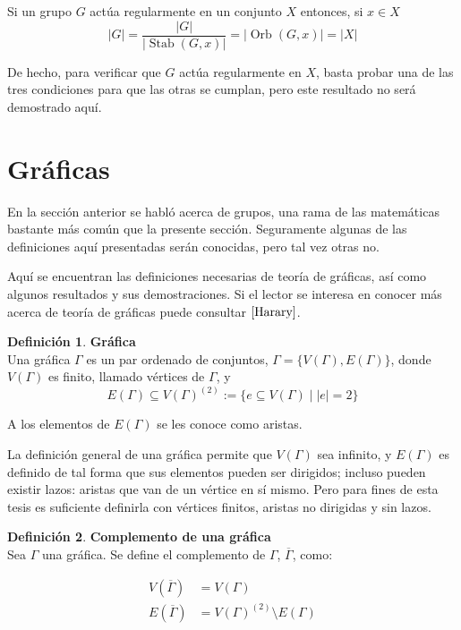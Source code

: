 \documentclass[12pt]{book}
\theoremstyle{definition}
\newtheorem{definition}{Definición}
\DeclareMathOperator{\Stab}{Stab}
\DeclareMathOperator{\orb}{Orb}
\begin{document}
Si un grupo $G$ actúa regularmente en un conjunto $X$ entonces, si $x \in X$
\begin{equation*}
  |G|=\frac{|G|}{|\Stab(G,x)|}
  = | \orb (G,x)|=|X|
\end{equation*}

De hecho, para verificar que $G$ actúa regularmente en $X$, basta
probar una de las tres condiciones para que las otras se cumplan, pero
este resultado no será demostrado aquí.

\section{Gráficas}

En la sección anterior se habló acerca de grupos, una rama de las
matemáticas bastante más común que la presente sección. Seguramente
algunas de las definiciones aquí presentadas serán conocidas, pero tal
vez otras no.

Aquí se encuentran las definiciones necesarias de teoría de gráficas,
así como algunos resultados y sus demostraciones. Si el lector se
interesa en conocer más acerca de teoría de gráficas puede consultar
$\cite{Harary}$.

\begin{definition}\textbf{Gráfica}\\
  Una gráfica $\Gamma$ es un par ordenado de conjuntos,
  $\Gamma=\{V(\Gamma),E(\Gamma)\}$, donde $V(\Gamma)$ es finito,
  llamado vértices de $\Gamma$, y
  \begin{equation*}
    E(\Gamma) \subseteq
    V(\Gamma)^{(2)}:=\{e\subseteq V(\Gamma) \mid |e|=2\}
  \end{equation*}
\end{definition}

A los elementos de $E(\Gamma)$ se les conoce como
aristas.

La definición general de una gráfica permite que $V(\Gamma)$ sea
infinito, y $E(\Gamma)$ es definido de tal forma que sus elementos
pueden ser dirigidos; incluso pueden existir
lazos: aristas que van de un vértice en sí mismo. Pero
para fines de esta tesis es suficiente definirla con vértices finitos,
aristas no dirigidas y sin lazos.

\begin{definition}\textbf{Complemento de una gráfica}\\
  Sea $\Gamma$ una gráfica. Se define el complemento de
  $\Gamma$, $\overline{\Gamma}$, como:

  \begin{equation*}
    \begin{split}
      V(\overline{\Gamma})&=V(\Gamma)\\
      E(\overline{\Gamma})&=V(\Gamma)^{(2)}\setminus E(\Gamma)
    \end{split}
  \end{equation*}

\end{definition}
\end{document}
